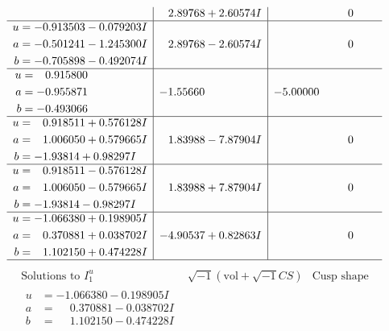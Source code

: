 \documentclass[1p]{elsarticle_modified}
\theoremstyle{definition}
\newcommand{\I}{\sqrt{-1}}
\begin{document}
$$\begin{array}{c|c|c}
 & \phantom{-}2.89768 + 2.60574 I & \phantom{-0.000000 } 0 \\ \hline\begin{aligned}
u &= -0.913503 - 0.079203 I \\
a &= -0.501241 - 1.245300 I \\
b &= -0.705898 - 0.492074 I\end{aligned}
 & \phantom{-}2.89768 - 2.60574 I & \phantom{-0.000000 } 0 \\ \hline\begin{aligned}
u &= \phantom{-}0.915800\phantom{ +0.000000I} \\
a &= -0.955871\phantom{ +0.000000I} \\
b &= -0.493066\phantom{ +0.000000I}\end{aligned}
 & -1.55660\phantom{ +0.000000I} & -5.00000\phantom{ +0.000000I} \\ \hline\begin{aligned}
u &= \phantom{-}0.918511 + 0.576128 I \\
a &= \phantom{-}1.006050 + 0.579665 I \\
b &= -1.93814 + 0.98297 I\end{aligned}
 & \phantom{-}1.83988 - 7.87904 I & \phantom{-0.000000 } 0 \\ \hline\begin{aligned}
u &= \phantom{-}0.918511 - 0.576128 I \\
a &= \phantom{-}1.006050 - 0.579665 I \\
b &= -1.93814 - 0.98297 I\end{aligned}
 & \phantom{-}1.83988 + 7.87904 I & \phantom{-0.000000 } 0 \\ \hline\begin{aligned}
u &= -1.066380 + 0.198905 I \\
a &= \phantom{-}0.370881 + 0.038702 I \\
b &= \phantom{-}1.102150 + 0.474228 I\end{aligned}
 & -4.90537 + 0.82863 I & \phantom{-0.000000 } 0\\
 \hline 
 \end{array}$$\newpage$$\begin{array}{c|c|c}  
\text{Solutions to }I^u_{1}& \I (\text{vol} + \sqrt{-1}CS) & \text{Cusp shape}\\
 \hline 
\begin{aligned}
u &= -1.066380 - 0.198905 I \\
a &= \phantom{-}0.370881 - 0.038702 I \\
b &= \phantom{-}1.102150 - 0.474228 I\end{aligned}

\end{array}$$
\end{document}
